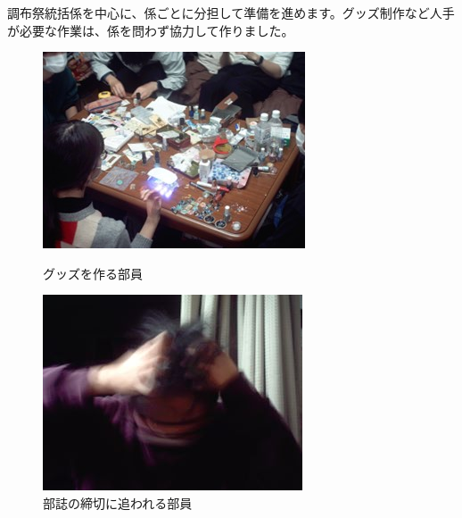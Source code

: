 \documentclass[../super_nova_20yy]{subfiles}
\begin{document}
調布祭統括係を中心に、係ごとに分担して準備を進めます。グッズ制作など人手が必要な作業は、係を問わず協力して作りました。
\begin{figure}[H]
  \centering
  \begin{minipage}[t]{0.4\columnwidth}
    \centering
    \includegraphics[width=\columnwidth]{画像6.jpg}
    \caption{グッズを作る部員}
    \label{fig:6}
  \end{minipage}
  \begin{minipage}[t]{0.4\columnwidth}
    \centering
    \includegraphics[width=\columnwidth]{画像7.jpg}
    \caption{部誌の締切に追われる部員}
    \label{fig:7}
  \end{minipage}
\end{figure}
\end{document}
